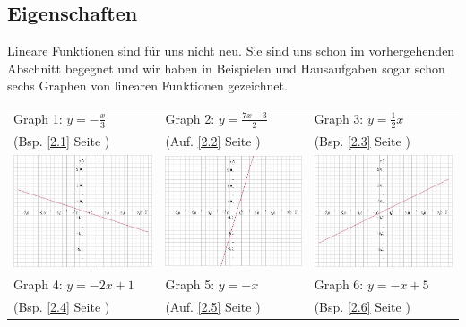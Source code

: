 \documentclass[a4paper, twoside, parskip, 10pt, smallheadings]{scrbook}
\theoremstyle{plain}
\theoremstyle{definition}
\begin{document}
\subsection{Eigenschaften}
Lineare Funktionen sind f\"{u}r uns nicht neu. Sie sind uns schon im
vorhergehenden Abschnitt begegnet und wir haben in Beispielen und
Hausaufgaben sogar schon sechs Graphen von linearen Funktionen
gezeichnet.
\begin{longtable}{p{5cm}p{5cm}p{5cm}}
  Graph 1: $y=-\frac{x}{3}$ &
  Graph 2: $y=\frac{7x-3}{2}$ & 
   Graph 3: $y=\frac{1}{2}x$ \\
      (Bsp. \ref{2.1} Seite \pageref{2.1}) &
   (Auf. \ref{2.2} Seite \pageref{2.2}) & 
  (Bsp. \ref{2.3} Seite \pageref{2.3})\\
   
\includegraphics[width=4.5cm]{2te/linearefunktion/bilder/lf1.jpg} & \includegraphics[width=4.5cm]{2te/linearefunktion/bilder/lf2.jpg}&
\includegraphics[width=4.5cm]{2te/linearefunktion/bilder/lf3.jpg} \\

Graph 4: $y=-2x+1$ 
  & Graph 5: $y=-x$  &
  Graph 6: $y=-x+5$  \\
 (Bsp. \ref{2.4} Seite \pageref{2.4})&
  (Auf. \ref{2.5} Seite \pageref{2.5}) &
   (Bsp. \ref{2.6} Seite \pageref{2.6})  \\
   

\end{longtable}
\end{document}
